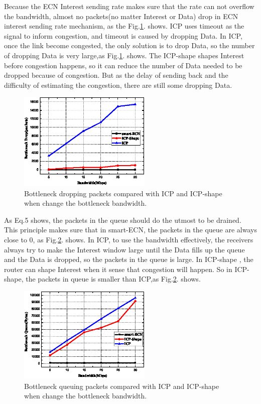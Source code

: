 Because the ECN Interest sending rate makes sure that the rate can not overflow the bandwidth, almost no packets(no matter Interest or Data) drop in ECN interest sending rate mechanism, as the Fig.\ref{fig-drop}. shows. ICP uses timeout as the signal to inform congestion, and timeout is caused by dropping Data. In ICP, once the link become congested, the only solution is to drop Data, so the number of dropping Data is very large,as Fig.\ref{fig-drop}. shows. The ICP-shape shapes Interest before congestion happens, so it can reduce the number of Data needed to be dropped because of congestion. But as the delay of sending back and the difficulty of estimating the congestion, there are still some dropping Data.
\begin{figure}[t]
\centering
\includegraphics[width=2.5in]{drop-pic-cut.eps}
\centering
\caption{Bottleneck dropping packets compared with ICP and ICP-shape when change the bottleneck bandwidth.}
\label{fig-drop}
\end{figure}

As Eq.5 shows, the packets in the queue should do the utmost to be drained. This principle makes sure that in smart-ECN, the packets in the queue are always close to 0, as Fig.\ref{fig-queue}. shows. In ICP, to use the bandwidth effectively, the receivers always try to make the Interest window large until the Data fills up the queue and the Data is dropped, so the packets in the queue is large.  In ICP-shape , the router can shape Interest when it sense that congestion will happen. So in ICP-shape, the packets in queue is smaller than ICP,as Fig.\ref{fig-queue}. shows.
\begin{figure}[t]
\centering
\includegraphics[width=2.5in]{queu-pic-cut.eps}
\centering
\caption{ Bottleneck queuing packets compared with ICP and ICP-shape when change the bottleneck bandwidth.}
\label{fig-queue}
\end{figure}

